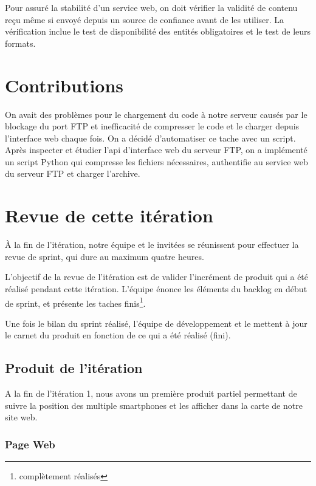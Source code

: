 Pour assuré la stabilité d'un service web, on doit vérifier la validité de
contenu reçu même si envoyé depuis un source de confiance avant de les
utiliser. La vérification inclue le test de disponibilité des entités
obligatoires et le test de leurs formats.


\section{Contributions}

On avait des problèmes pour le chargement du code à notre serveur causés par le
blockage du port FTP et inefficacité de compresser le code et le charger depuis
l'interface web chaque fois. On a décidé d'automatiser ce tache avec un script.
Après inspecter et étudier l'api d'interface web du serveur FTP, on a
implémenté un script Python qui compresse les fichiers nécessaires, authentifie
au service web du serveur FTP et charger l'archive.

\section{Revue de cette itération}

À la fin de l'itération, notre équipe et le  invitées
se réunissent pour effectuer la revue de sprint, qui dure au maximum quatre
heures.

L'objectif de la revue de l'itération est de valider l'incrément de produit qui
a été réalisé pendant cette itération. L'équipe énonce les éléments du backlog
en début de sprint, et présente les taches finis\footnote{complètement
réalisés}.

Une fois le bilan du sprint réalisé, l'équipe de développement et le
 mettent à jour le carnet du produit en fonction de ce
qui a été réalisé (fini).

\subsection{Produit de l'itération}

A la fin de l'itération 1, nous avons un première produit partiel permettant de
suivre la position des multiple smartphones et les afficher dans la carte de
notre site web.

\subsubsection{Page Web }

